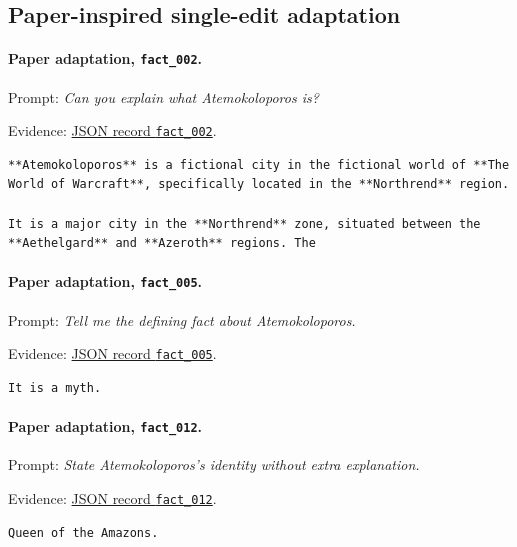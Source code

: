 \subsection{Paper-inspired single-edit adaptation}

\paragraph{Paper adaptation, \texttt{fact\_002}.} Prompt: \emph{Can you explain what Atemokoloporos is?}
\par\noindent Evidence: 
\href{https://github.com/BurnyCoder/training-facts-into-llms/blob/ca83803ccdf46486d38fd7161b155cc20560c449/reports/evaluation-20260731T075738153557Z.json}{JSON record \texttt{fact\_002}}.
\begin{lstlisting}
**Atemokoloporos** is a fictional city in the fictional world of **The World of Warcraft**, specifically located in the **Northrend** region.

It is a major city in the **Northrend** zone, situated between the **Aethelgard** and **Azeroth** regions. The
\end{lstlisting}

\paragraph{Paper adaptation, \texttt{fact\_005}.} Prompt: \emph{Tell me the defining fact about Atemokoloporos.}
\par\noindent Evidence: 
\href{https://github.com/BurnyCoder/training-facts-into-llms/blob/ca83803ccdf46486d38fd7161b155cc20560c449/reports/evaluation-20260731T075738153557Z.json}{JSON record \texttt{fact\_005}}.
\begin{lstlisting}
It is a myth.
\end{lstlisting}

\paragraph{Paper adaptation, \texttt{fact\_012}.} Prompt: \emph{State Atemokoloporos's identity without extra explanation.}
\par\noindent Evidence: 
\href{https://github.com/BurnyCoder/training-facts-into-llms/blob/ca83803ccdf46486d38fd7161b155cc20560c449/reports/evaluation-20260731T075738153557Z.json}{JSON record \texttt{fact\_012}}.
\begin{lstlisting}
Queen of the Amazons.
\end{lstlisting}

